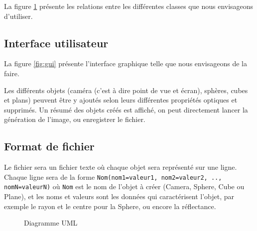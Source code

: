 \documentclass[a4paper]{article}
\begin{document}
    La figure \ref{fig:uml} présente les relations entre les différentes classes
    que nous envisageons d'utiliser.

  \subsection{Interface utilisateur}
    La figure \ref{fig:gui} présente l'interface graphique telle que nous
    envisageons de la faire.

    Les différents objets (caméra (c'est à dire point de vue et écran),
    sphères, cubes et plans) peuvent être y ajoutés selon leurs différentes
    propriétés optiques et supprimés. Un résumé des objets créés est affiché, on
    peut directement lancer la génération de l'image, ou enregistrer le fichier.

  \subsection{Format de fichier}
    Le fichier sera un fichier texte où chaque objet sera représenté sur une
    ligne. Chaque ligne sera de la forme
    \verb+Nom(nom1=valeur1, nom2=valeur2, .., nomN=valeurN)+ où \verb+Nom+ est
    le nom de l'objet à créer (Camera, Sphere, Cube ou Plane), et les noms et
    valeurs sont les données qui caractérisent l'objet, par exemple le rayon
    et le centre pour la Sphere, ou encore la réflectance.

    \begin{landscape}
      \thispagestyle{empty}
      \begin{figure}[p]
        \caption{Diagramme UML\label{fig:uml}}
      \end{figure}
    \end{landscape}
    \restoregeometry
\end{document}

